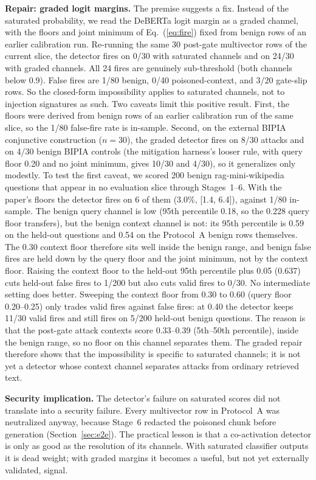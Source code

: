 \documentclass[conference]{IEEEtran}
\begin{document}
\textbf{Repair: graded logit margins.} The premise suggests a fix. Instead of the saturated probability, we read the DeBERTa logit margin as a graded channel, with the floors and joint minimum of Eq.~(\ref{eq:fire}) fixed from benign rows of an earlier calibration run. Re-running the same 30 post-gate multivector rows of the current slice, the detector fires on 0/30 with saturated channels and on 24/30 with graded channels. All 24 fires are genuinely sub-threshold (both channels below 0.9). False fires are 1/80 benign, 0/40 poisoned-context, and 3/20 gate-slip rows. So the closed-form impossibility applies to saturated channels, not to injection signatures as such. Two caveats limit this positive result. First, the floors were derived from benign rows of an earlier calibration run of the same slice, so the 1/80 false-fire rate is in-sample. Second, on the external BIPIA conjunctive construction ($n=30$), the graded detector fires on 8/30 attacks and on 4/30 benign BIPIA controls (the mitigation harness's looser rule, with query floor 0.20 and no joint minimum, gives 10/30 and 4/30), so it generalizes only modestly. To test the first caveat, we scored 200 benign rag-mini-wikipedia questions that appear in no evaluation slice through Stages~1--6. With the paper's floors the detector fires on 6 of them (3.0\%, [1.4, 6.4]), against 1/80 in-sample. The benign query channel is low (95th percentile 0.18, so the 0.228 query floor transfers), but the benign context channel is not: its 95th percentile is 0.59 on the held-out questions and 0.54 on the Protocol~A benign rows themselves. The 0.30 context floor therefore sits well inside the benign range, and benign false fires are held down by the query floor and the joint minimum, not by the context floor. Raising the context floor to the held-out 95th percentile plus 0.05 (0.637) cuts held-out false fires to 1/200 but also cuts valid fires to 0/30. No intermediate setting does better. Sweeping the context floor from 0.30 to 0.60 (query floor 0.20--0.25) only trades valid fires against false fires: at 0.40 the detector keeps 11/30 valid fires and still fires on 5/200 held-out benign questions. The reason is that the post-gate attack contexts score 0.33--0.39 (5th--50th percentile), inside the benign range, so no floor on this channel separates them. The graded repair therefore shows that the impossibility is specific to saturated channels; it is not yet a detector whose context channel separates attacks from ordinary retrieved text.

\textbf{Security implication.} The detector's failure on saturated scores did not translate into a security failure. Every multivector row in Protocol~A was neutralized anyway, because Stage~6 redacted the poisoned chunk before generation (Section~\ref{sec:e2e}). The practical lesson is that a co-activation detector is only as good as the resolution of its channels. With saturated classifier outputs it is dead weight; with graded margins it becomes a useful, but not yet externally validated, signal.
\end{document}

